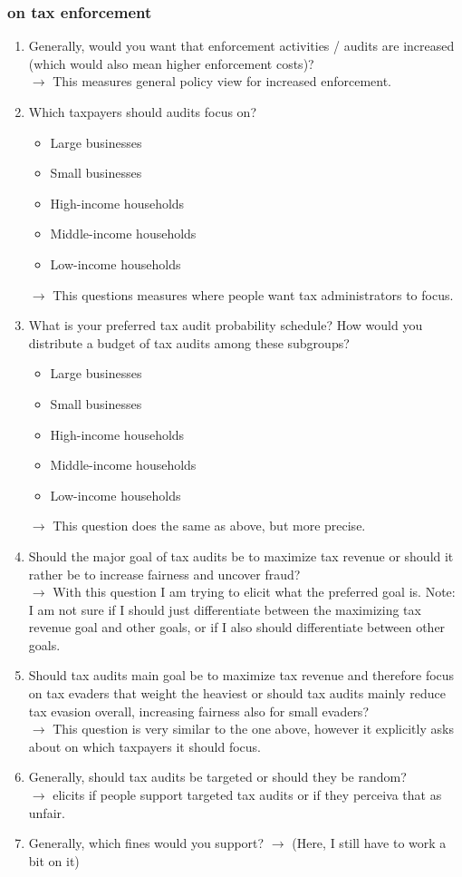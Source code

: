 \documentclass[12pt]{article}
\begin{document}
\subsubsection{on tax enforcement}
\begin{enumerate}
    \item Generally, would you want that enforcement activities / audits are increased (which would also mean higher enforcement costs)? \\ $\rightarrow$ This measures general policy view for increased enforcement.
    \item Which taxpayers should audits focus on? 
     \begin{itemize}
        \item Large businesses
        \item Small businesses
        \item High-income households
        \item Middle-income households
        \item Low-income households
    \end{itemize} $\rightarrow$ This questions measures where people want tax administrators to focus.
    \item What is your preferred tax audit probability schedule? How would you distribute a budget of tax audits among these subgroups? 
    \begin{itemize}
        \item Large businesses
        \item Small businesses
        \item High-income households
        \item Middle-income households
        \item Low-income households
    \end{itemize} $\rightarrow$ This question does the same as above, but more precise.
    \item Should the major goal of tax audits be to maximize tax revenue or should it rather be to increase fairness and uncover fraud? \\ $\rightarrow$ With this question I am trying to elicit what the preferred goal is. Note: I am not sure if I should just differentiate between the maximizing tax revenue goal and other goals, or if I also should differentiate between other goals. 
    \item Should tax audits main goal be to maximize tax revenue and therefore focus on tax evaders that weight the heaviest or should tax audits mainly reduce tax evasion overall, increasing fairness also for small evaders? \\ $\rightarrow$ This question is very similar to the one above, however it explicitly asks about on which taxpayers it should focus. 
    \item Generally, should tax audits be targeted or should they be random? \\ $\rightarrow$ elicits if people support targeted tax audits or if they perceiva that as unfair.  
    \item Generally, which fines would you support?  $\rightarrow$ (Here, I still have to work a bit on it)
 \end{enumerate}
\end{document}
